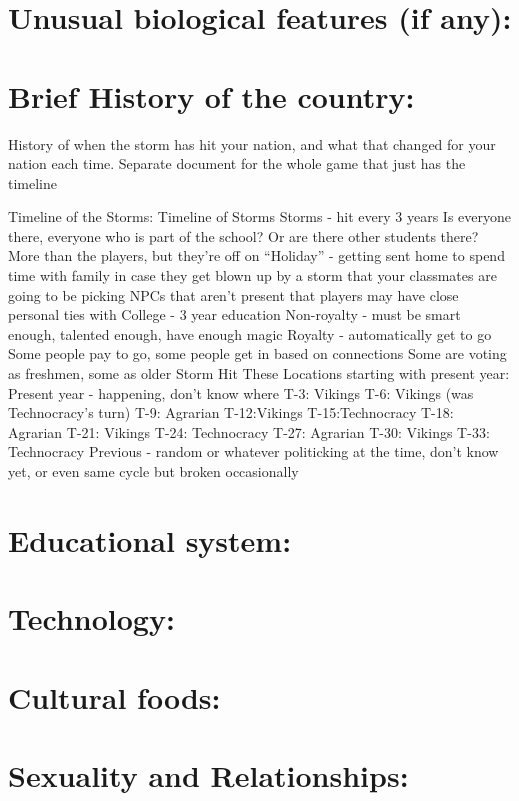 \documentclass[blue]{GL2020}
\begin{document}
\section{Unusual biological features (if any):}

\section{Brief History of the country:}

History of when the storm has hit your nation, and what that changed for your nation each time.
Separate document for the whole game that just has the timeline

Timeline of the Storms:
Timeline of Storms
Storms - hit every 3 years
Is everyone there, everyone who is part of the school?  Or are there other students there?
More than the players, but they’re off on “Holiday” - getting sent home to spend time with family in case they get blown up by a storm that your classmates are going to be picking
NPCs that aren’t present that players may have close personal ties with
College - 3 year education
Non-royalty - must be smart enough, talented enough, have enough magic
Royalty - automatically get to go
Some people pay to go, some people get in based on connections
Some are voting as freshmen, some as older
Storm Hit These Locations starting with present year:
Present year - happening, don’t know where
T-3: Vikings
T-6: Vikings (was Technocracy’s turn)
T-9: Agrarian
T-12:Vikings
T-15:Technocracy
T-18: Agrarian
T-21: Vikings
T-24: Technocracy
T-27: Agrarian
T-30: Vikings
T-33: Technocracy
Previous - random or whatever politicking at the time, don’t know yet, or even same cycle but broken occasionally

\section{Educational system:}

\section{Technology:}

\section{Cultural foods:}

\section{Sexuality and Relationships:}
\end{document}
